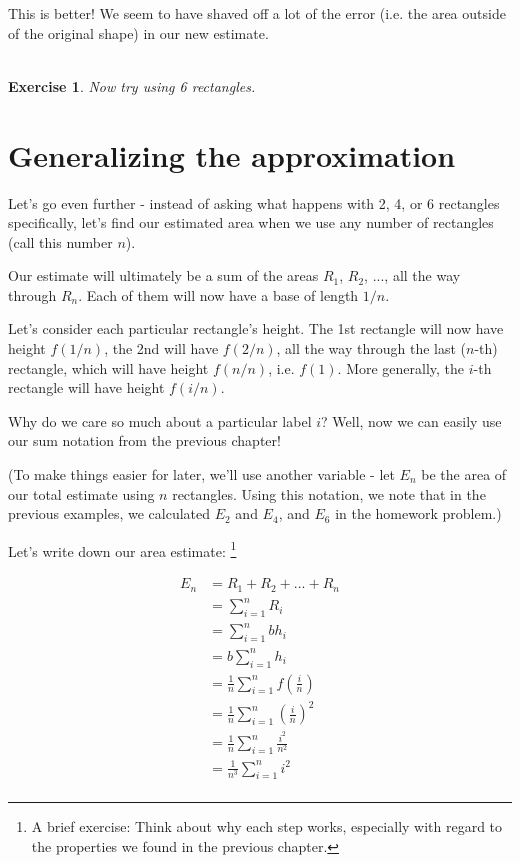\documentclass{book}
\newtheorem{exercise}{\\ \bf Exercise}
\begin{document}

This is better! We seem to have shaved off a lot of the error (i.e. the area outside of the original shape) in our new estimate. 

\begin{exercise}
Now try using 6 rectangles.
\end{exercise}


\section{Generalizing the approximation}

Let's go even further - instead of asking what happens with 2, 4, or 6 rectangles specifically, let's find our estimated area when we use any number of rectangles (call this number $n$). 

Our estimate will ultimately be a sum of the areas $R_1$, $R_2$, ..., all the way through $R_n$. Each of them will now have a base of length $1/n$. 

Let's consider each particular rectangle's height. The 1st rectangle will now have height $f(1/n)$, the 2nd will have $f(2/n)$, all the way through the last ($n$-th) rectangle, which will have height $f(n/n)$, i.e. $f(1)$. More generally, the $i$-th rectangle will have height $f(i/n)$. 



Why do we care so much about a particular label $i$? Well, now we can easily use our sum notation from the previous chapter! 

(To make things easier for later, we'll use another variable - let $E_n$ be the area of our total estimate using $n$ rectangles. Using this notation, we note that in the previous examples, we calculated $E_2$ and $E_4$, and $E_6$ in the homework problem.)

Let's write down our area estimate: \footnote{A brief exercise: Think about why each step works, especially with regard to the properties we found in the previous chapter.}


\begin{align*}
E_n &= R_1 + R_2 + ... + R_n \\
&= \sum_{i=1}^n R_i \\
&= \sum_{i=1}^n b h_i \\
&= b \sum_{i=1}^n h_i \\
&= \frac{1}{n} \sum_{i=1}^n f(\frac{i}{n}) \\
&= \frac{1}{n} \sum_{i=1}^n \left(\frac{i}{n}\right)^2 \\
&= \frac{1}{n} \sum_{i=1}^n \frac{i^2}{n^2} \\
&= \frac{1}{n^3} \sum_{i=1}^n i^2 \\
\end{align*}
\end{document}
